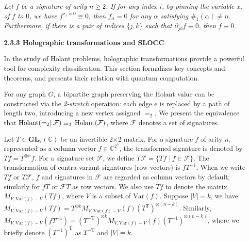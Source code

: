 {\itshape Let $f$ be a signature of arity $n\geq 2$. If for any index $i$, by pinning the variable $x_{i}$ of $f$ to $0$, we have $f^{x_{i}=0}\equiv 0$, then $f_{\alpha}=0$ for any $\alpha$ satisfying $\#_{1}(\alpha)\neq n$. Furthermore, if there is a pair of indices $\{j,k\}$ such that $\partial_{jk}f\equiv 0$, then $f\equiv 0$.}\par







\par\medskip\noindent\textbf{
2.3.3 Holographic transformations and SLOCC}\par




In the study of Holant problems, holographic transformations provide a powerful tool for complexity classification. This section formalizes key concepts and theorems, and presents their relation with quantum computation.\par




For any graph $G$, a bipartite graph preserving the Holant value can be constructed via the \emph{2-stretch} operation: each edge $e$ is replaced by a path of length two, introducing a new vertex assigned $=_{2}$. We present the equivalence that $\textup{{Holant}}(=_{2}\mid\mathcal{F})\equiv_{T}\textup{{Holant}}(\mathcal{F})$, where $\mathcal{F}$ denotes a set of signatures.\par




Let $T\in\mathbf{GL}_{2}(\mathbb{C})$ be an invertible 2×2 matrix. For a signature $f$ of arity $n$, represented as a column vector $f\in\mathbb{C}^{2^{n}}$, the transformed signature is denoted by $Tf=T^{\otimes n}f$. For a signature set $\mathcal{F}$, we define $T\mathcal{F}=\{Tf\mid f\in\mathcal{F}\}$. The transformation of contra-variant signatures (row vectors) is $fT^{-1}$. When we write $Tf$ or $T\mathcal{F}$, $f$ and signatures in $\mathcal{F}$ are regarded as column vectors by default; similarly for $fT$ or $\mathcal{F}T$ as row vectors. We also use $Tf$ to denote the matrix $M_{V,\text{Var}(f)-V}(Tf)$, where $V$ is a subset of $\text{Var}(f)$. Suppose $|V|=k$, we have $M_{V,\text{Var}(f)-V}(Tf)=T^{\otimes k}M_{V,\text{Var}(f)-V}(f)\left(T^{\mathrm{T}}\right)^{\otimes(n-k)}$. Similarly, $M_{V,\text{Var}(f)-V}\left(fT^{-1}\right)=\left(T^{-\mathrm{T}}\right)^{\otimes k}M_{V,\text{Var}(f)-V}(f)\left(T^{-1}\right)^{\otimes(n-k)}$, where we briefly denote $(T^{-1})^{\mathrm{T}}$ as $T^{-\mathrm{T}}$ and $|V|=k$.\par




